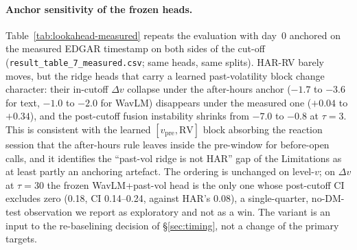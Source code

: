 \paragraph{Anchor sensitivity of the frozen heads.}
Table~\ref{tab:lookahead-measured} repeats the evaluation with day~0 anchored on
the measured EDGAR timestamp on both sides of the cut-off
(\texttt{result\_table\_7\_measured.csv}; same heads, same splits). HAR-RV barely
moves, but the ridge heads that carry a learned past-volatility block change
character: their in-cutoff $\Delta v$ collapse under the after-hours anchor
($-1.7$ to $-3.6$ for text, $-1.0$ to $-2.0$ for WavLM) disappears under the
measured one ($+0.04$ to $+0.34$), and the post-cutoff fusion instability shrinks
from $-7.0$ to $-0.8$ at $\tau{=}3$. This is consistent with the learned
$[v_{\mathrm{pre}}, \mathrm{RV}]$ block absorbing the reaction session that the
after-hours rule leaves inside the pre-window for before-open calls, and it
identifies the ``past-vol ridge is not HAR'' gap of the Limitations as at least
partly an anchoring artefact. The ordering is unchanged on level-$v$; on
$\Delta v$ at $\tau{=}30$ the frozen WavLM+past-vol head is the only one whose
post-cutoff CI excludes zero (0.18, CI 0.14--0.24, against HAR's 0.08), a
single-quarter, no-DM-test observation we report as exploratory and not as a win.
The variant is an input to the re-baselining decision of \S\ref{sec:timing}, not a
change of the primary targets.



